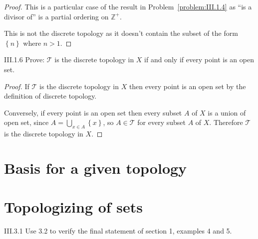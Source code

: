 \begin{proof}
	This is a particular case of the result in Problem~\ref{problem:III.1.4} as ``is a divisor of'' is a partial ordering on \( \mathbb{Z}^{+} \).

	This is not the discrete topology as it doesn't contain the subset of the form \( \left\{ n \right\} \) where \( n > 1 \).
\end{proof}

\begin{problem}{III.1.6}
Prove: \( \mathscr{T} \) is the discrete topology in \( X \) if and only if every point is an open set.
\end{problem}

\begin{proof}
	If \( \mathscr{T} \) is the discrete topology in \( X \) then every point is an open set by the definition of discrete topology.

	Conversely, if every point is an open set then every subset \( A \) of \( X \) is a union of open set, since \( A = \bigcup_{x\in A} \left\{x\right\} \), so \( A \in \mathscr{T} \) for every subset \( A \) of \( X \). Therefore \( \mathscr{T} \) is the discrete topology in \( X \).
\end{proof}

\section{Basis for a given topology}

\section{Topologizing of sets}

\begin{problem}{III.3.1}
Use 3.2 to verify the final statement of section 1, examples 4 and 5.
\end{problem}

